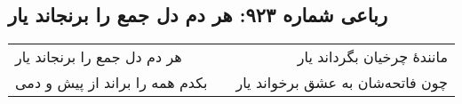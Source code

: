 \begin{center}
\section*{رباعی شماره ۹۲۳: هر دم دل جمع را برنجاند یار}
\label{sec:0923}
\begin{longtable}{l p{0.5cm} r}
هر دم دل جمع را برنجاند یار
&&
مانندهٔ چرخیان بگرداند یار
\\
بکدم همه را براند از پیش و دمی
&&
چون فاتحه‌شان به عشق برخواند یار
\\
\end{longtable}
\end{center}
